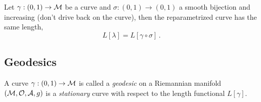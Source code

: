 \documentclass[11pt, a4paper, twocolumn]{article} %
\begin{document}
\begin{theorem}
    Let $\gamma: (0,1)\to\mathcal{M}$ be a curve and
    $\sigma: (0,1)\to(0,1)$ a smooth bijection and increasing (don't drive back
    on the curve), then the reparametrized curve has the same length,
    \begin{equation}
        L[\lambda] = L[\gamma\circ\sigma]\,.
    \end{equation}
\end{theorem}

\subsection{Geodesics}
\begin{defn}[Geodesic]
    A curve $\gamma: (0,1) \to \mathcal{M}$ is called a \textit{geodesic} on a
    Riemannian manifold $(\mathcal{M}, \mathcal{O}, \mathcal{A}, g)$ is a \textit{stationary}
    curve with respect to the length functional $L[\gamma]$.
\end{defn}
\end{document}
